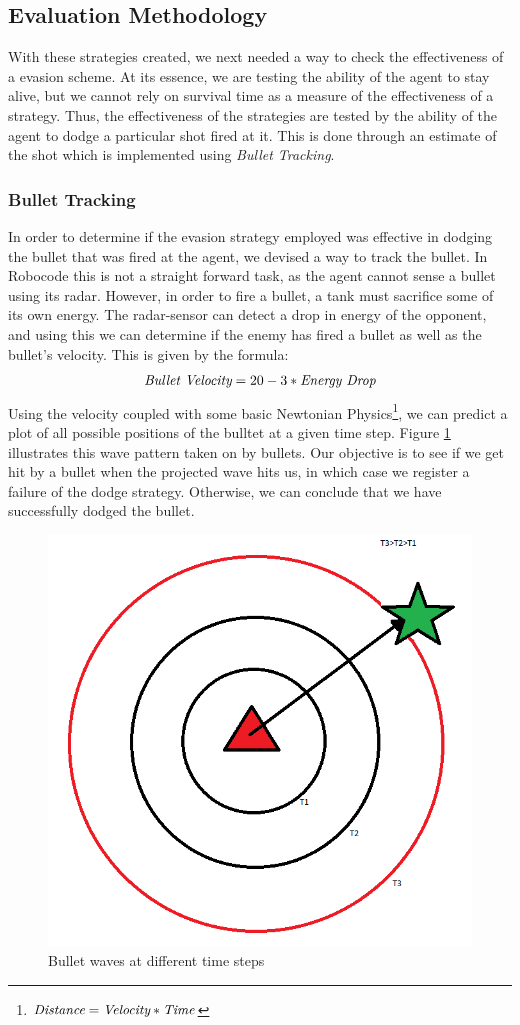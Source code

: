 \documentclass{article}
\theoremstyle{plain}
\theoremstyle{definition}
\theoremstyle{remark}
\begin{document}
\subsection*{Evaluation Methodology}
With these strategies created, we next needed a way to check the effectiveness of a evasion scheme. At its essence, we are testing the ability of the agent to stay alive, but we cannot rely on survival time as a measure of the effectiveness of a strategy. Thus, the effectiveness of the strategies are tested by the ability of the agent to dodge a particular shot fired at it. This is done through an estimate of the shot which is implemented using \emph{Bullet Tracking}.

\subsubsection*{Bullet Tracking}
In order to determine if the evasion strategy employed was effective in dodging the bullet that was fired at the agent, we devised a way to track the bullet. In Robocode this is not a straight forward task, as the agent cannot sense a bullet using its radar. However, in order to fire a bullet, a tank must sacrifice some of its own energy. The radar-sensor can detect a drop in energy of the opponent, and using this we can determine if the enemy has fired a bullet as well as the bullet's velocity. This is given by the formula:
$$\emph{Bullet Velocity} = 20 - 3 * \emph{Energy Drop}$$
Using the velocity coupled with some basic Newtonian Physics\footnote{$\emph{Distance} = \emph{Velocity} * \emph{Time}$}, we can predict a plot of all possible positions of the bulltet at a given time step.
Figure \ref{b_wave} illustrates this wave pattern taken on by bullets. Our objective is to see if we get hit by a bullet when the projected wave hits us, in which case we register a failure of the dodge strategy. Otherwise, we can conclude that we have successfully dodged the bullet.

\begin{figure}[h]
	\centering
		\includegraphics[width=5 cm]{bullet_wave.png}
	\caption{Bullet waves at different time steps}
	\label{b_wave}
\end{figure}
\end{document}
